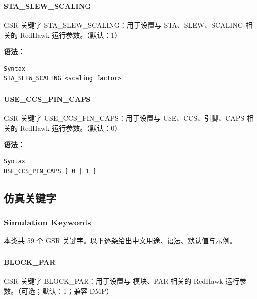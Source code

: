 \subsubsection{}
\paragraph*{STA_SLEW_SCALING}

GSR 关键字 STA_SLEW_SCALING：用于设置与 STA、SLEW、SCALING 相关的 RedHawk 运行参数。（默认：1）

\textbf{语法：}
\begin{lstlisting}
Syntax
STA_SLEW_SCALING <scaling factor>
\end{lstlisting}

\subsubsection{}
\paragraph*{USE_CCS_PIN_CAPS}

GSR 关键字 USE_CCS_PIN_CAPS：用于设置与 USE、CCS、引脚、CAPS 相关的 RedHawk 运行参数。（默认：0）

\textbf{语法：}
\begin{lstlisting}
Syntax
USE_CCS_PIN_CAPS [ 0 | 1 ]
\end{lstlisting}

\subsection{仿真关键字}
\subsubsection*{Simulation Keywords}

本类共 59 个 GSR 关键字。以下逐条给出中文用途、语法、默认值与示例。

\subsubsection{}
\paragraph*{BLOCK_PAR}

GSR 关键字 BLOCK_PAR：用于设置与 模块、PAR 相关的 RedHawk 运行参数。（可选；默认：1；兼容 DMP）


